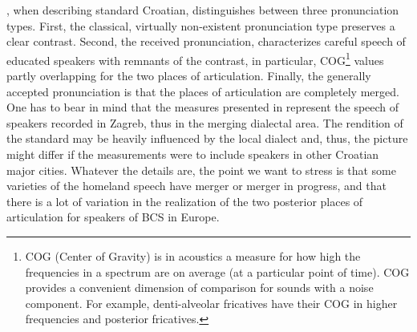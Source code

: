 \documentclass[output=paper,modfonts,nonflat,
]{langsci/langscibook}
\begin{document}
\citet{Škarić2009}, when describing standard Croatian, distinguishes between three pronunciation types. First, the classical, virtually non-existent pronunciation type preserves a clear contrast. Second, the received pronunciation, characterizes careful speech of educated speakers with remnants of the contrast, in particular, COG\footnote{COG (Center of Gravity) is in acoustics a measure for how high the frequencies in a spectrum are on average (at a particular point of time). COG provides a convenient dimension of comparison for sounds with a noise component. For example, denti-alveolar fricatives have their COG in higher frequencies and posterior fricatives.} values partly overlapping for the two places of articulation. Finally, the generally accepted pronunciation is that the places of articulation are completely merged. One has to bear in mind that the measures presented in \citet{Škarić2009} represent the speech of speakers recorded in Zagreb, thus in the merging dialectal area. The rendition of the standard may be heavily influenced by the local dialect and, thus, the picture might differ if the measurements were to include speakers in other Croatian major cities. Whatever the details are, the point we want to stress is that some varieties of the homeland speech have merger or merger in progress, and that there is a lot of variation in the realization of the two posterior places of articulation for speakers of BCS in Europe.
\end{document}
